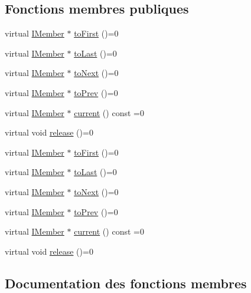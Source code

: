 \subsection*{Fonctions membres publiques}
\begin{DoxyCompactItemize}
\item 
virtual \hyperlink{class_i_member}{I\+Member} $\ast$ \hyperlink{class_i_member_iterator_a5ffeb99766096be9e85733b546b26cbc}{to\+First} ()=0
\item 
virtual \hyperlink{class_i_member}{I\+Member} $\ast$ \hyperlink{class_i_member_iterator_abce20fda9911d31a06710b56da4007cd}{to\+Last} ()=0
\item 
virtual \hyperlink{class_i_member}{I\+Member} $\ast$ \hyperlink{class_i_member_iterator_a1101f634e4d459d50e4a66023e47160f}{to\+Next} ()=0
\item 
virtual \hyperlink{class_i_member}{I\+Member} $\ast$ \hyperlink{class_i_member_iterator_a2b23b711e8956f275db92029e6f0571f}{to\+Prev} ()=0
\item 
virtual \hyperlink{class_i_member}{I\+Member} $\ast$ \hyperlink{class_i_member_iterator_a6944323e79ce8284a3eb4287b42a79a8}{current} () const  =0
\item 
virtual void \hyperlink{class_i_member_iterator_a88aac68a285813f5bc37b6da24648cd8}{release} ()=0
\item 
virtual \hyperlink{class_i_member}{I\+Member} $\ast$ \hyperlink{class_i_member_iterator_a5ffeb99766096be9e85733b546b26cbc}{to\+First} ()=0
\item 
virtual \hyperlink{class_i_member}{I\+Member} $\ast$ \hyperlink{class_i_member_iterator_abce20fda9911d31a06710b56da4007cd}{to\+Last} ()=0
\item 
virtual \hyperlink{class_i_member}{I\+Member} $\ast$ \hyperlink{class_i_member_iterator_a1101f634e4d459d50e4a66023e47160f}{to\+Next} ()=0
\item 
virtual \hyperlink{class_i_member}{I\+Member} $\ast$ \hyperlink{class_i_member_iterator_a2b23b711e8956f275db92029e6f0571f}{to\+Prev} ()=0
\item 
virtual \hyperlink{class_i_member}{I\+Member} $\ast$ \hyperlink{class_i_member_iterator_a6944323e79ce8284a3eb4287b42a79a8}{current} () const  =0
\item 
virtual void \hyperlink{class_i_member_iterator_a88aac68a285813f5bc37b6da24648cd8}{release} ()=0
\end{DoxyCompactItemize}


\subsection{Documentation des fonctions membres}
\hypertarget{class_i_member_iterator_a6944323e79ce8284a3eb4287b42a79a8}{}
